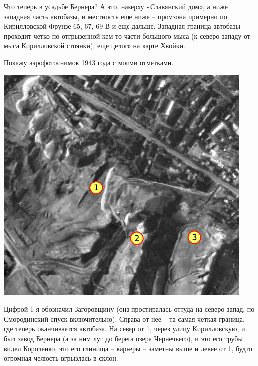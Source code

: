 
Что теперь в усадьбе Бернера? А это, наверху «Славянский дом», а ниже западная часть автобазы, и местность еще ниже – промзона примерно по Кирилловской-Фрунзе 65, 67, 69-В и еще дальше. Западная граница автобазы проходит четко по отгрызенной кем-то части большого мыса (к северо-западу от мыса Кирилловской стоянки), еще целого на карте Хвойки.

Покажу аэрофотоснимок 1943 года с моими отметками.

\begin{center}
\includegraphics[width=\linewidth]{chast-kirvys/beylis/1943-berner-map.jpg}
\end{center}

Цифрой 1 я обозначил Загоровщину (она простиралась оттуда на северо-запад, по Смородинский спуск включительно). Справа от нее – та самая четкая граница, где теперь оканчивается автобаза. На север от 1, через улицу Кирилловскую, и был завод Бернера (а за ним луг до берега озера Чернечьего), и это его трубы видел Короленко, это его глинища – карьеры – заметны выше и левее от 1, будто огромная челюсть вгрызлась в склон.

